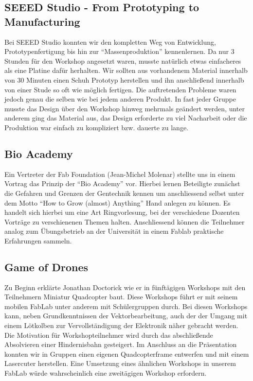 \documentclass{\basedir/fablab-document}
\begin{document}
\subsection*{SEEED Studio - From Prototyping to Manufacturing}

Bei SEEED Studio konnten wir den kompletten Weg von Entwicklung,
Prototypenfertigung bis hin zur ``Massenproduktion'' kennenlernen. Da
nur 3 Stunden für den Workshop angesetzt waren, musste natürlich etwas
einfacheres als eine Platine dafür herhalten. Wir sollten aus
vorhandenem Material innerhalb von 30 Minuten einen Schuh Prototyp
herstellen und ihn anschließend innerhalb von einer Stude so oft wie
möglich fertigen. Die auftretenden Probleme waren jedoch genau die selben
wie bei jedem anderen Produkt. In fast jeder Gruppe musste das Design
über den Workshop hinweg mehrmals geändert werden, unter anderem ging
das Material aus, das Design erforderte zu viel Nacharbeit oder die
Produktion war einfach zu kompliziert bzw. dauerte zu lange.

\subsection*{Bio Academy}

Ein Vertreter der Fab Foundation (Jean-Michel Molenar) stellte uns in
einem Vortrag das Prinzip der ``Bio Academy'' vor. Hierbei lernen
Beteiligte zunächst die Gefahren und Grenzen der Gentechnik kennen um
anschliessend selbst unter dem Motto ``How to Grow (almost) Anything''
Hand anlegen zu können. Es handelt sich hierbei um eine Art
Ringvorlesung, bei der verschiedene Dozenten Vorträge zu verschienenen
Themen halten. Anschliessend können die Teilnehmer analog zum
Übungsbetrieb an der Universität in einem Fablab praktische Erfahrungen
sammeln.

\subsection*{Game of Drones}

Zu Beginn erklärte Jonathan Doctorick wie er in fünftägigen Workshops
mit den Teilnehmern Miniatur Quadcopter baut. Diese Workshops führt er
mit seinem mobilen FabLab unter anderem mit Schülergruppen durch. Bei
diesen Workshops kann, neben Grundkenntnissen der Vektorbearbeitung,
auch der der Umgang mit einem Lötkolben zur Vervollständigung der
Elektronik näher gebracht werden. Die Motivation für Workshopteilnehmer
wird durch das abschließende Absolvieren einer Hindernisbahn gesteigert.
Im Anschluss an die Präsentation konnten wir in Gruppen einen eigenen
Quadcopterframe entwerfen und mit einem Lasercuter herstellen. Eine
Umsetzung eines ähnlichen Workshops in unserem FabLab würde
wahrscheinlich eine zweitägigen Workshop erfordern.
\end{document}
